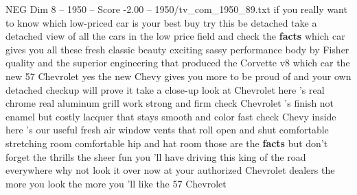 \begin{textsample}{NEG Dim 8 – 1950 – Score -2.00 – 1950/tv\_com\_1950\_89.txt}  \label{ex:f8_neg_086}
if you really want to know which low-priced car is your best buy try this be detached take a detached view of all the cars in the low price field and check the \textbf{facts} which car gives you all these fresh classic beauty exciting sassy performance body by Fisher quality and the superior engineering that produced the Corvette v8 which car the new 57 Chevrolet yes the new Chevy gives you more to be proud of and your own detached checkup will prove it take a close-up look at Chevrolet here 's real chrome real aluminum grill work strong and firm check Chevrolet 's finish not enamel but costly lacquer that stays smooth and color fast check Chevy inside here 's our useful fresh air window vents that roll open and shut comfortable stretching room comfortable hip and hat room those are the \textbf{facts} but don't forget the thrills the sheer fun you 'll have driving this king of the road everywhere why not look it over now at your authorized Chevrolet dealers the more you look the more you 'll like the 57 Chevrolet

\end{textsample}
